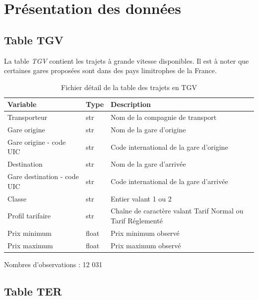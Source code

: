 \documentclass[
]{article}
\begin{document}
\hypertarget{pruxe9sentation-des-donnuxe9es}{%
\section{Présentation des données}\label{pruxe9sentation-des-donnuxe9es}}

\hypertarget{table-tgv}{%
\subsection{Table TGV}\label{table-tgv}}

La table \emph{TGV} contient les trajets à grande vitesse disponibles. Il est à noter que certaines gares proposées sont dans des pays limitrophes de la France.

\begin{table}[H]

\caption{\label{tab:unnamed-chunk-1}Fichier détail de la table des trajets en TGV}
\centering
\begin{threeparttable}
\begin{tabular}[t]{l|l|l}
\hline
Variable & Type & Description\\
\hline
Transporteur & str & Nom de la compagnie de transport\\
\hline
Gare origine & str & Nom de la gare d’origine\\
\hline
Gare origine - code UIC & str & Code international de la gare d’origine\\
\hline
Destination & str & Nom de la gare d’arrivée\\
\hline
Gare destination - code UIC & str & Code international de la gare d’arrivée\\
\hline
Classe & str & Entier valant 1 ou 2\\
\hline
Profil tarifaire & str & Chaîne de caractère valant Tarif Normal ou Tarif Réglementé\\
\hline
Prix minimum & float & Prix minimum observé\\
\hline
Prix maximum & float & Prix maximum observé\\
\hline
\end{tabular}
\begin{tablenotes}[para]
\item Nombres d'observations : 12 031
\end{tablenotes}
\end{threeparttable}
\end{table}

\hypertarget{table-ter}{%
\subsection{Table TER}\label{table-ter}}
\end{document}
